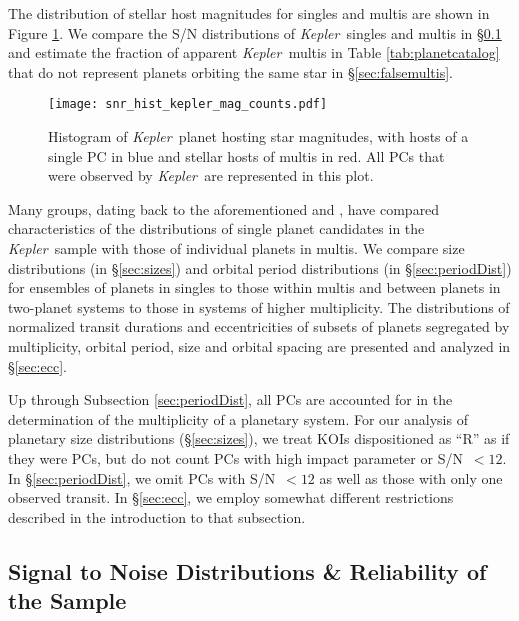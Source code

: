 \documentclass{aastex62}
\newcommand{\ik}{{\it Kepler~}}
\begin{document}
The distribution of stellar host magnitudes for singles and multis are shown in Figure \ref{fig:magnitudes}. We compare the S/N distributions of \ik singles and multis in \S\ref{sec:snr} and estimate the fraction of apparent \ik multis in Table \ref{tab:planetcatalog} that do not represent planets orbiting the same star in \S\ref{sec:falsemultis}.

\begin{figure}
    \centering
    \texttt{[image: snr\_hist\_kepler\_mag\_counts.pdf]}
    \caption{Histogram of \ik planet hosting star magnitudes, with hosts of a single PC in blue and stellar hosts of multis in red.  All PCs that were observed by \ik are represented in this plot.}%
    \label{fig:magnitudes}
\end{figure}

Many groups, dating back to the aforementioned \citet{Lissauer:2011b} and \citet{Latham:2011}, have compared characteristics of the distributions of single planet candidates in the \ik sample with those of individual planets in multis. We compare size distributions (in \S\ref{sec:sizes})   and orbital period distributions (in \S\ref{sec:periodDist}) for ensembles of planets in singles to those within multis and between planets in two-planet systems to those in systems of higher multiplicity. The distributions of normalized transit durations and eccentricities of subsets of planets segregated by multiplicity, orbital period, size and orbital spacing are presented and analyzed in \S\ref{sec:ecc}. 

Up through Subsection \ref{sec:periodDist}, all PCs are accounted for in the determination of the multiplicity of a planetary system. For our analysis of planetary size distributions (\S\ref{sec:sizes}), we treat KOIs dispositioned as ``R'' as if they were PCs, but do not count PCs with high impact parameter or  S/N~$< 12$. In \S\ref{sec:periodDist}, we omit PCs with S/N~$< 12$ as well as those with only one observed transit. In \S\ref{sec:ecc}, we employ somewhat different restrictions described in the introduction to that subsection.


\subsection{Signal to Noise Distributions {\& Reliability of the Sample}}\label{sec:snr}
\end{document}
